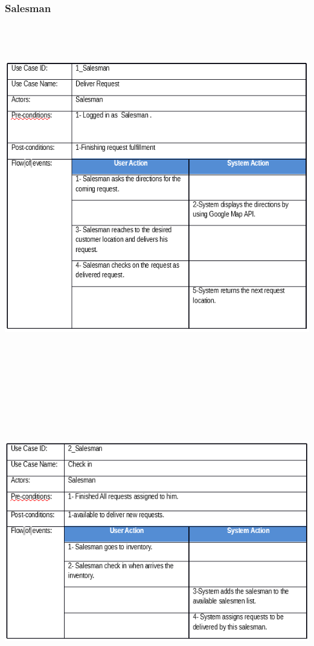 \documentclass[12pt]{article}
\begin{document}
\subsubsection{ Salesman }
\begin{center}
	\includegraphics[width=17cm,height=15cm]{./assets/usecasetable/distributer-1.png}\\
	\includegraphics[width=17cm,height=15cm]{./assets/usecasetable/distributer-2.png}\\
\end{center}
\end{document}
